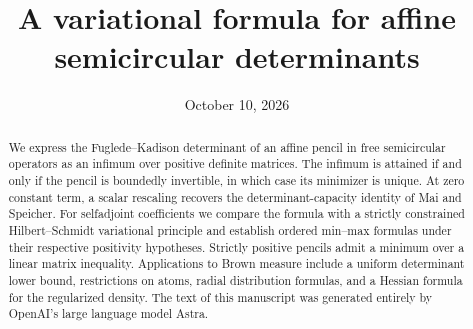 \documentclass[11pt,reqno]{amsart}
\title[Affine semicircular determinants]{A variational formula for affine semicircular determinants}
\date{October 10, 2026}
\theoremstyle{definition}
\theoremstyle{remark}
\numberwithin{equation}{section}
\begin{document}
\begin{abstract}
We express the Fuglede--Kadison determinant of an affine pencil in free semicircular operators as an infimum over positive definite matrices.
The infimum is attained if and only if the pencil is boundedly invertible, in which case its minimizer is unique.
At zero constant term, a scalar rescaling recovers the determinant-capacity identity of Mai and Speicher.
For selfadjoint coefficients we compare the formula with a strictly constrained Hilbert--Schmidt variational principle and establish ordered min--max formulas under their respective positivity hypotheses.
Strictly positive pencils admit a minimum over a linear matrix inequality.
Applications to Brown measure include a uniform determinant lower bound, restrictions on atoms, radial distribution formulas, and a Hessian formula for the regularized density.
The text of this manuscript was generated entirely by OpenAI's large language model Astra.
\end{abstract}
\maketitle
\tableofcontents







\appendix



\end{document}
